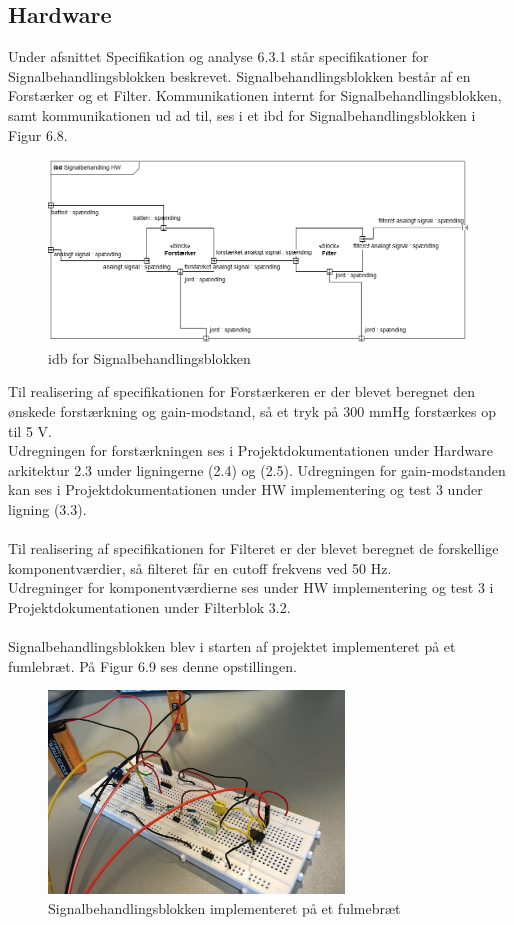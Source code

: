 \subsection{Hardware}
Under afsnittet Specifikation og analyse 6.3.1 står specifikationer for Signalbehandlingsblokken beskrevet. Signalbehandlingsblokken består af en Forstærker og et Filter. Kommunikationen internt for Signalbehandlingsblokken, samt kommunikationen ud ad til, ses i et ibd for Signalbehandlingsblokken i Figur 6.8.  

\begin{figure}[H]
	\centering
	\includegraphics[width=1\textwidth]{Figurer/5}
	\caption{idb for Signalbehandlingsblokken}
\end{figure}

Til realisering af specifikationen for Forstærkeren er der blevet beregnet den ønskede forstærkning og gain-modstand, så et tryk på 300 mmHg forstærkes op til 5 V.\\
Udregningen for forstærkningen ses i Projektdokumentationen under Hardware arkitektur 2.3 under ligningerne (2.4) og (2.5). Udregningen for gain-modstanden kan ses i Projektdokumentationen under HW implementering og test 3 under ligning (3.3).  
\\\\
Til realisering af specifikationen for Filteret er der blevet beregnet de forskellige komponentværdier, så filteret får en cutoff frekvens ved 50 Hz.\\
Udregninger for komponentværdierne ses under HW implementering og test 3 i Projektdokumentationen under Filterblok 3.2. 
\\\\ 
Signalbehandlingsblokken blev i starten af projektet implementeret på et fumlebræt. På Figur 6.9 ses denne opstillingen. 

\begin{figure}[H]
	\centering
	\includegraphics[width=0.7\textwidth]{Figurer/Snip20151213_83}
	\caption{Signalbehandlingsblokken implementeret på et fulmebræt}
\end{figure} 


